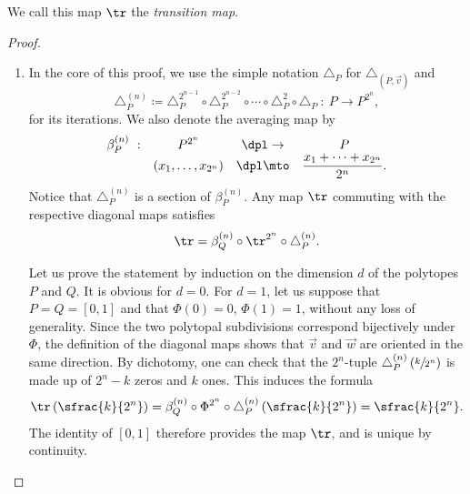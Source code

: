 We call this map $\tr$ the \emph{transition map}.

\skpt
\begin{proof}
\begin{enumerate}
\item
In the core of this proof, we use the simple notation $\triangle_P$ for $\triangle_{(P, \vec v)}$ and
\[\triangle^{(n)}_P\coloneqq \triangle^{2^{n-1}}_P\circ \triangle^{2^{n-2}}_P\circ\cdots\circ\triangle^{2}_P\circ\triangle_P\ : \
P\to P^{2^{n}},\]
for its iterations.
We also denote the averaging map by
\begin{align*}
\begin{array}{rccc}
\beta^{(n)}_P\ : & P^{2^n}&\dpl\to &P\\
&(x_1, \ldots, x_{2^n}) & \dpl\mto&
\displaystyle \frac{x_1+\cdots+x_{2^n}}{2^n}.
\end{array}
\end{align*}
Notice that $\triangle^{(n)}_P$ is a section of $\beta^{(n)}_P$.
Any map $\tr$ commuting with the respective diagonal maps satisfies
\[\tr = \beta^{(n)}_Q\circ\tr^{2^n}\circ\triangle^{(n)}_P. \]

Let us prove the statement by induction on the dimension $d$ of the polytopes $P$ and $Q$. It is obvious for $d=0$. For $d=1$, let us suppose that $P=Q=[0,1]$ and that $\Phi(0)=0$, $\Phi(1)=1$, without any loss of generality.
Since the two polytopal subdivisions correspond bijectively under $\Phi$, the definition of the diagonal maps shows that $\vec v$ and $\vec w$ are oriented in the same direction. By dichotomy, one can check that the $2^n$-tuple $\triangle^{(n)}_P\left(\sfrac{k}{2^n}\right)$ is made up of $2^{n}-k$ zeros and $k$ ones. This induces the formula
\[\tr\left(\sfrac{k}{2^n}\right)
= \beta^{(n)}_Q\circ\Phi^{2^n}\circ\triangle^{(n)}_P\left(\sfrac{k}{2^n}\right)
= \sfrac{k}{2^n}. \]
The identity of $[0, 1]$ therefore provides the map $\tr$, and is unique by continuity.


\end{enumerate}
\end{proof}
